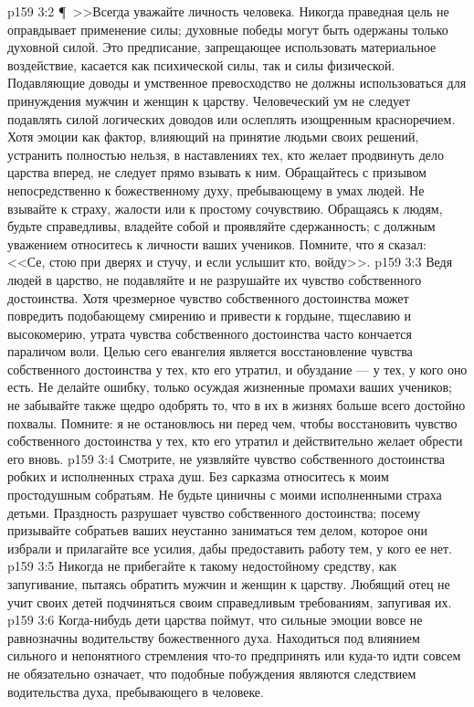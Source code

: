 \vs p159 3:2 \P\ >>Всегда уважайте личность человека. Никогда праведная цель не оправдывает применение силы; духовные победы могут быть одержаны только духовной силой. Это предписание, запрещающее использовать материальное воздействие, касается как психической силы, так и силы физической. Подавляющие доводы и умственное превосходство не должны использоваться для принуждения мужчин и женщин к царству. Человеческий ум не следует подавлять силой логических доводов или ослеплять изощренным красноречием. Хотя эмоции как фактор, влияющий на принятие людьми своих решений, устранить полностью нельзя, в наставлениях тех, кто желает продвинуть дело царства вперед, не следует прямо взывать к ним. Обращайтесь с призывом непосредственно к божественному духу, пребывающему в умах людей. Не взывайте к страху, жалости или к простому сочувствию. Обращаясь к людям, будьте справедливы, владейте собой и проявляйте сдержанность; с должным уважением относитесь к личности ваших учеников. Помните, что я сказал: <<Се, стою при дверях и стучу, и если услышит кто, войду>>.
\vs p159 3:3 Ведя людей в царство, не подавляйте и не разрушайте их чувство собственного достоинства. Хотя чрезмерное чувство собственного достоинства может повредить подобающему смирению и привести к гордыне, тщеславию и высокомерию, утрата чувства собственного достоинства часто кончается параличом воли. Целью сего евангелия является восстановление чувства собственного достоинства у тех, кто его утратил, и обуздание --- у тех, у кого оно есть. Не делайте ошибку, только осуждая жизненные промахи ваших учеников; не забывайте также щедро одобрять то, что в их в жизнях больше всего достойно похвалы. Помните: я не остановлюсь ни перед чем, чтобы восстановить чувство собственного достоинства у тех, кто его утратил и действительно желает обрести его вновь.
\vs p159 3:4 Смотрите, не уязвляйте чувство собственного достоинства робких и исполненных страха душ. Без сарказма относитесь к моим простодушным собратьям. Не будьте циничны с моими исполненными страха детьми. Праздность разрушает чувство собственного достоинства; посему призывайте собратьев ваших неустанно заниматься тем делом, которое они избрали и прилагайте все усилия, дабы предоставить работу тем, у кого ее нет.
\vs p159 3:5 Никогда не прибегайте к такому недостойному средству, как запугивание, пытаясь обратить мужчин и женщин к царству. Любящий отец не учит своих детей подчиняться своим справедливым требованиям, запугивая их.
\vs p159 3:6 Когда\hyp{}нибудь дети царства поймут, что сильные эмоции вовсе не равнозначны водительству божественного духа. Находиться под влиянием сильного и непонятного стремления что\hyp{}то предпринять или куда\hyp{}то идти совсем не обязательно означает, что подобные побуждения являются следствием водительства духа, пребывающего в человеке.
